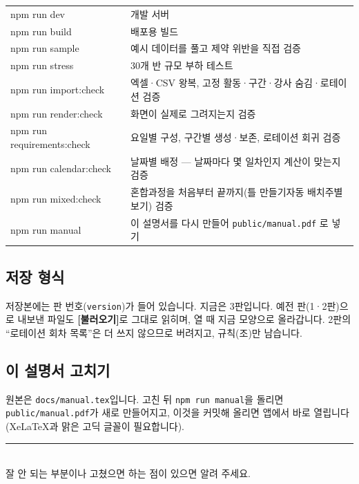 \documentclass[11pt,a4paper]{article}
\newcommand{\btn}[1]{\textcolor{ttdark}{\sffamily\bfseries[#1]}}   %
\newcommand{\code}[1]{\texttt{\small #1}}
\begin{document}
\begin{center}
\begin{tabularx}{\linewidth}{@{}>{\ttfamily\small}l X@{}}
\toprule
npm run dev & 개발 서버 \\
npm run build & 배포용 빌드 \\
npm run sample & 예시 데이터를 풀고 제약 위반을 직접 검증 \\
npm run stress & 30개 반 규모 부하 테스트 \\
npm run import:check & 엑셀·CSV 왕복, 고정 활동·구간·강사 숨김·로테이션 검증 \\
npm run render:check & 화면이 실제로 그려지는지 검증 \\
npm run requirements:check & 요일별 구성, 구간별 생성·보존, 로테이션 회귀 검증 \\
npm run calendar:check & 날짜별 배정 --- 날짜마다 몇 일차인지 계산이 맞는지 검증 \\
npm run mixed:check & 혼합과정을 처음부터 끝까지(틀 만들기\textrightarrow{}자동 배치\textrightarrow{}주별 보기) 검증 \\
npm run manual & 이 설명서를 다시 만들어 \code{public/manual.pdf} 로 넣기 \\
\bottomrule
\end{tabularx}
\end{center}

\subsection{저장 형식}

저장본에는 판 번호(\code{version})가 들어 있습니다. 지금은 3판입니다.
예전 판(1·2판)으로 내보낸 파일도 \btn{불러오기}로 그대로 읽히며, 열 때 지금 모양으로 올라갑니다.
2판의 ``로테이션 회차 목록''은 더 쓰지 않으므로 버려지고, 규칙(조)만 남습니다.

\subsection{이 설명서 고치기}

원본은 \code{docs/manual.tex}입니다. 고친 뒤 \code{npm run manual}을 돌리면
\code{public/manual.pdf}가 새로 만들어지고, 이것을 커밋해 올리면 앱에서 바로 열립니다
(XeLaTeX과 맑은 고딕 글꼴이 필요합니다).

\vfill
\begin{center}
{\color{ttline}\rule{0.5\linewidth}{0.8pt}}\\[0.8em]
{\small\color{ttgray} 잘 안 되는 부분이나 고쳤으면 하는 점이 있으면 알려 주세요.}
\end{center}
\end{document}

